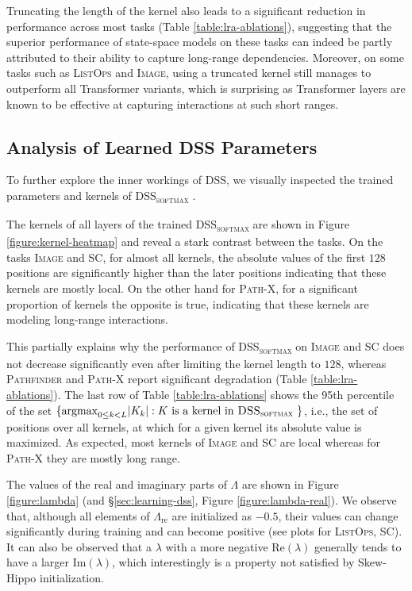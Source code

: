 Truncating the length of the kernel also leads to a significant reduction in performance across most tasks (Table \ref{table:lra-ablations}), suggesting that the superior performance of state-space models on these tasks can indeed be partly attributed to their ability to capture long-range dependencies. Moreover, on some tasks such as \textsc{ListOps} and \textsc{Image}, using a truncated kernel still manages to outperform all Transformer variants, which is surprising as Transformer layers are known to be effective at capturing interactions at such short ranges.

\subsection{Analysis of Learned DSS Parameters}\label{sec:kernel-analysis}

To further explore the inner workings of DSS, we visually inspected the trained parameters and kernels of \textsc{DSS}\textsubscript{\textsc{softmax}} .

The kernels of all layers of the trained \textsc{DSS}\textsubscript{\textsc{softmax}}  are shown in Figure \ref{figure:kernel-heatmap} and reveal a stark contrast between the tasks. On the tasks \textsc{Image} and \textsc{SC}, for almost all kernels, the absolute values of the first $128$ positions are significantly higher than the later positions indicating that these kernels are mostly local. On the other hand for \textsc{Path-X}, for a significant proportion of kernels the opposite is true, indicating that these kernels are modeling long-range interactions. 

This partially explains why the performance of \textsc{DSS}\textsubscript{\textsc{softmax}}  on \textsc{Image} and \textsc{SC} does not decrease significantly even after limiting the kernel length to $128$, whereas \textsc{Pathfinder} and \textsc{Path-X} report significant degradation (Table \ref{table:lra-ablations}). The last row of Table \ref{table:lra-ablations} shows the 95th percentile of the set $\{\mathrm{argmax}_{0 \leq k < L} |K_k| : K \text{ is a kernel in \textsc{DSS}\textsubscript{\textsc{softmax}} }\}$, i.e., the set of positions over all kernels, at which for a given kernel its absolute value is maximized. As expected, most kernels of \textsc{Image} and \textsc{SC} are local whereas for \textsc{Path-X} they are mostly long range.

The values of the real and imaginary parts of $\Lambda$ are shown in Figure \ref{figure:lambda} (and \S\ref{sec:learning-dss}, Figure  \ref{figure:lambda-real}). We observe that, although all elements of $\Lambda_\mathrm{re}$ are initialized as $-0.5$, their values can change significantly during training and can become positive (see plots for \textsc{ListOps}, \textsc{SC}). It can also be observed that a $\lambda$ with a more negative $\mathrm{Re}(\lambda)$ generally tends to have a larger $\mathrm{Im}(\lambda)$, which interestingly is a property not satisfied by Skew-Hippo initialization.

